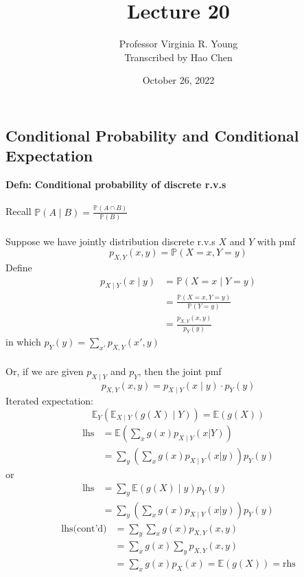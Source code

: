 \documentclass[a4paper]{article}
\title{Lecture 20}
\author{Professor Virginia R. Young\\ \small{Transcribed by Hao Chen}}
\date{October 26, 2022}
\newcommand{\n}{\hfill\break}
\newcommand{\defn}[1]{\par\noindent\settowidth{\hangindent}{\textbf{Defn: }}\textbf{Defn: }#1\n}
\newcommand{\Prob}{\mathbb{P}}
\renewcommand{\P}{\Prob}
\newcommand{\Avg}{\mathbb{E}}
\newcommand{\E}{\Avg}
\begin{document}
\maketitle

\subsection*{Conditional Probability and Conditional Expectation}


\defn{
    \textbf{Conditional probability of discrete r.v.s}
    \\\\
    Recall $\P(A\mid B)=\frac{\P(A\cap B)}{\P(B)}$
    \\\\
    Suppose we have jointly distribution discrete r.v.s $X$ and $Y$ with pmf
    \[p_{X,Y}(x,y)=\P(X=x, Y=y)\]
    Define
    \begin{align*}
        p_{X\mid Y}(x\mid y)&=\P(X=x\mid Y=y) \\
        &=\frac{\P(X=x, Y=y)}{\P(Y=y)} \\
        &=\frac{p_{X,Y}(x,y)}{p_Y(y)}
    \end{align*}
    in which $p_Y(y)=\sum_{x'}p_{X,Y}(x',y)$
    \\\\
    Or, if we are given $p_{X\mid Y}$ and $p_Y$, then the joint pmf
    \[p_{X,Y}(x,y)=p_{X\mid Y}(x\mid y)\cdot p_Y(y)\]
    Iterated expectation:
    \[\E_Y(\E_{X\mid Y}(g(X)\mid Y))=\E(g(X))\]
    \begin{align*}
        \text{lhs}&=\E\left(\sum_x g(x)p_{X\mid Y}(x|Y)\right) \\
        &=\sum_y\left(\sum_x g(x)p_{X\mid Y}(x|y)\right)p_Y(y)
    \end{align*}
    or
    \begin{align*}
        \text{lhs}&=\sum_y\E(g(X)\mid y)p_Y(y) \\
        &=\sum_y\left(\sum_x g(x)p_{X\mid Y}(x|y)\right)p_Y(y)
    \end{align*}
    \begin{align*}
        \text{lhs(cont'd)}&=\sum_y\sum_x g(x)p_{X,Y}(x,y) \\
        &=\sum_x g(x)\sum_y p_{X,Y}(x,y) \\
        &=\sum_x g(x)p_X(x)=\E(g(X))=\text{rhs}
    \end{align*}
}
\end{document}
